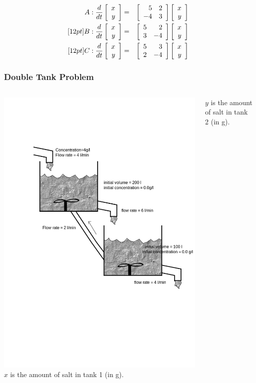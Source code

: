 {\begin{frame}
{        \begin{eqnarray*}
          A: \frac{d}{dt} \left[ \begin{array}{r} x \\ y \end{array} \right] & = & \left[ \begin{array}{rr} 5 & 2 \\ -4 & 3 \end{array} \right] \left[ \begin{array}{r} x \\ y \end{array} \right] \\ [12pt]
          B: \frac{d}{dt} \left[ \begin{array}{r} x \\ y \end{array} \right] & = & \left[ \begin{array}{rr} 5 & 2 \\ 3 & -4 \end{array} \right] \left[ \begin{array}{r} x \\ y \end{array} \right] \\ [12pt]
          C: \frac{d}{dt} \left[ \begin{array}{r} x \\ y \end{array} \right] & = & \left[ \begin{array}{rr} 5 & 3 \\ 2 & -4 \end{array} \right] \left[ \begin{array}{r} x \\ y \end{array} \right] 
        \end{eqnarray*}

          \vfill

     }\fi

    \vfill
    \vfill
    \vfill

\end{frame}

}


\begin{frame}
  \frametitle{Double Tank Problem}

  \begin{columns}
    {\includegraphics[width=1.5\textwidth]{img/introLinearAlgebraTankProblem}}   
    $x$ is the amount of salt in tank 1 (in g).

    $y$ is the amount of salt in tank 2 (in g).
    \vspace{3cm}
  \end{columns}
\end{frame}

